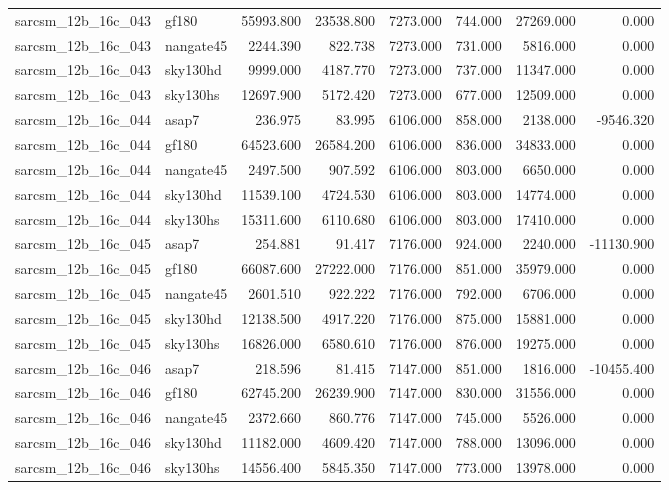 \begin{tabular}{llrrrrrr}
sarcsm\_12b\_16c\_043 & gf180 & 55993.800 & 23538.800 & 7273.000 & 744.000 & 27269.000 & 0.000 \\
sarcsm\_12b\_16c\_043 & nangate45 & 2244.390 & 822.738 & 7273.000 & 731.000 & 5816.000 & 0.000 \\
sarcsm\_12b\_16c\_043 & sky130hd & 9999.000 & 4187.770 & 7273.000 & 737.000 & 11347.000 & 0.000 \\
sarcsm\_12b\_16c\_043 & sky130hs & 12697.900 & 5172.420 & 7273.000 & 677.000 & 12509.000 & 0.000 \\
sarcsm\_12b\_16c\_044 & asap7 & 236.975 & 83.995 & 6106.000 & 858.000 & 2138.000 & -9546.320 \\
sarcsm\_12b\_16c\_044 & gf180 & 64523.600 & 26584.200 & 6106.000 & 836.000 & 34833.000 & 0.000 \\
sarcsm\_12b\_16c\_044 & nangate45 & 2497.500 & 907.592 & 6106.000 & 803.000 & 6650.000 & 0.000 \\
sarcsm\_12b\_16c\_044 & sky130hd & 11539.100 & 4724.530 & 6106.000 & 803.000 & 14774.000 & 0.000 \\
sarcsm\_12b\_16c\_044 & sky130hs & 15311.600 & 6110.680 & 6106.000 & 803.000 & 17410.000 & 0.000 \\
sarcsm\_12b\_16c\_045 & asap7 & 254.881 & 91.417 & 7176.000 & 924.000 & 2240.000 & -11130.900 \\
sarcsm\_12b\_16c\_045 & gf180 & 66087.600 & 27222.000 & 7176.000 & 851.000 & 35979.000 & 0.000 \\
sarcsm\_12b\_16c\_045 & nangate45 & 2601.510 & 922.222 & 7176.000 & 792.000 & 6706.000 & 0.000 \\
sarcsm\_12b\_16c\_045 & sky130hd & 12138.500 & 4917.220 & 7176.000 & 875.000 & 15881.000 & 0.000 \\
sarcsm\_12b\_16c\_045 & sky130hs & 16826.000 & 6580.610 & 7176.000 & 876.000 & 19275.000 & 0.000 \\
sarcsm\_12b\_16c\_046 & asap7 & 218.596 & 81.415 & 7147.000 & 851.000 & 1816.000 & -10455.400 \\
sarcsm\_12b\_16c\_046 & gf180 & 62745.200 & 26239.900 & 7147.000 & 830.000 & 31556.000 & 0.000 \\
sarcsm\_12b\_16c\_046 & nangate45 & 2372.660 & 860.776 & 7147.000 & 745.000 & 5526.000 & 0.000 \\
sarcsm\_12b\_16c\_046 & sky130hd & 11182.000 & 4609.420 & 7147.000 & 788.000 & 13096.000 & 0.000 \\
sarcsm\_12b\_16c\_046 & sky130hs & 14556.400 & 5845.350 & 7147.000 & 773.000 & 13978.000 & 0.000 \\

\end{tabular}
